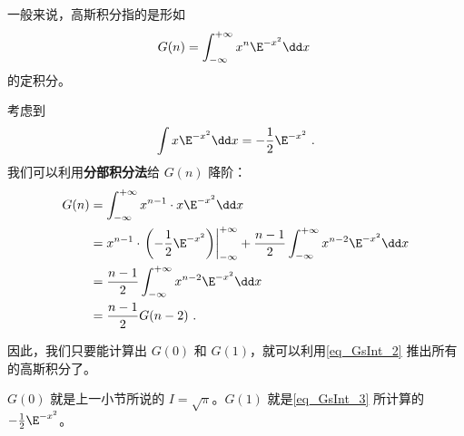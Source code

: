 一般来说，高斯积分指的是形如
\begin{equation}
G(n)=\int_{-\infty}^{+\infty} x^n\E^{-x^2}\dd x~
\end{equation}
的定积分。

考虑到
\begin{equation}\label{eq_GsInt_3}
\int x\E^{-x^2}\dd x=-\frac{1}{2}\E^{-x^2}~.
\end{equation}
我们可以利用\textbf{分部积分法}给 $G(n)$ 降阶：
\begin{equation}\label{eq_GsInt_2}
\begin{aligned}
G(n)&=\int_{-\infty}^{+\infty} x^{n-1}\cdot x\E^{-x^2}\dd x\\
&=x^{n-1}\cdot\left.\left(-\frac{1}{2}\E^{-x^2}\right)\right|_{-\infty}^{+\infty}+\frac{n-1}{2}\int_{-\infty}^{+\infty} x^{n-2}\E^{-x^2}\dd x\\
&=\frac{n-1}{2}\int_{-\infty}^{+\infty} x^{n-2}\E^{-x^2}\dd x\\
&=\frac{n-1}{2}G(n-2)~.
\end{aligned}
\end{equation}

因此，我们只要能计算出 $G(0)$ 和 $G(1)$，就可以利用\autoref{eq_GsInt_2} 推出所有的高斯积分了。

$G(0)$ 就是上一小节所说的 $I=\sqrt{\pi}$。$G(1)$ 就是\autoref{eq_GsInt_3} 所计算的 $-\frac{1}{2}\E^{-x^2}$。









